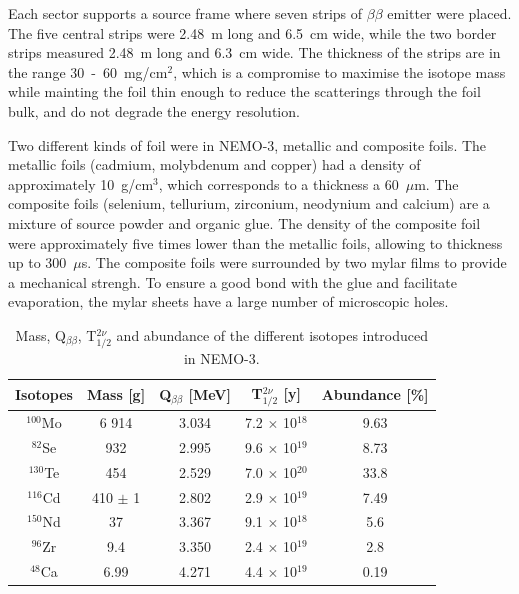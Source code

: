 \documentclass[main.tex]{subfiles}
\begin{document}
\NI Each sector supports a source frame where seven strips of $\beta\beta$ emitter were placed. The five central strips were 2.48~m long and 6.5~cm wide, while the two border strips measured 2.48~m long and 6.3~cm wide. The thickness of the strips are in the range 30~-~60~mg/cm$^\text{2}$, which is a compromise to maximise the isotope mass while mainting the foil thin enough to reduce the scatterings through the foil bulk, and do not degrade the energy resolution.


\bigskip


\NI Two different kinds of foil were in NEMO-3, metallic and composite foils. The metallic foils (cadmium, molybdenum and copper) had a density of approximately 10~g/cm$^\text{3}$, which corresponds to a thickness a 60~$\mu$m. The composite foils (selenium, tellurium, zirconium, neodynium and calcium) are a mixture of source powder and organic glue. The density of the composite foil were approximately five times lower than the metallic foils, allowing to thickness up to 300~$\mu$s. The composite foils were surrounded by two mylar films to provide a mechanical strengh. To ensure a good bond with the glue and facilitate evaporation, the mylar sheets have a large number of microscopic holes.



\begin{table}[h!]
\centering
\begin{tabular}{c|c|c|c|c}
Isotopes & Mass [g] & Q$_{\beta\beta}$ [MeV] & T$_{\text{1/2}}^{\text{2}\nu}$ [y] & Abundance [\%]\\[0.05cm]
\toprule
$^{\text{100}}$Mo & 6 914 & 3.034 & 7.2 $\times$ 10$^{\text{18}}$ & 9.63 \\[0.1cm]
$^{\text{82}}$Se  & 932   & 2.995 & 9.6 $\times$ 10$^{\text{19}}$ & 8.73 \\[0.1cm]
$^{\text{130}}$Te & 454   & 2.529 & 7.0 $\times$ 10$^{\text{20}}$ & 33.8 \\[0.1cm]
$^{\text{116}}$Cd & 410 $\pm$ 1   & 2.802 & 2.9 $\times$ 10$^{\text{19}}$ & 7.49 \\[0.1cm]
$^{\text{150}}$Nd & 37    & 3.367 & 9.1 $\times$ 10$^{\text{18}}$ & 5.6  \\[0.1cm]
$^{\text{96}}$Zr  & 9.4   & 3.350 & 2.4 $\times$ 10$^{\text{19}}$ & 2.8  \\[0.1cm]
$^{\text{48}}$Ca  & 6.99  & 4.271 & 4.4 $\times$ 10$^{\text{19}}$ & 0.19 \\[0.1cm]
\bottomrule
\end{tabular}
\caption{Mass, Q$_{\beta\beta}$, T$_{\text{1/2}}^{\text{2}\nu}$ and abundance of the different isotopes introduced in NEMO-3.}
\label{tab:isotopeNEMO3}
\end{table} 
\end{document}
